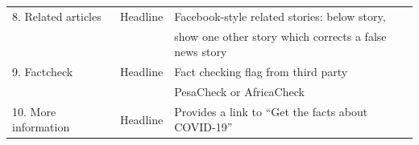 \documentclass[letterpaper, 12pt, parskip=full,]{scrartcl}
\begin{document}
\begin{table}[H]
\begin{adjustbox}{max width = \textwidth}
\begin{tabular}{l|l|l}
\\
8. Related articles                                                                                                       & Headline                                                                                                     & Facebook-style related stories: below story,\\ & & show one other story which corrects a false news story                                                                                                                                                                                                                                                                                             \\
9. Factcheck                                                                                                      & Headline                                                                                                     & Fact checking flag from third party\\ & & PesaCheck or AfricaCheck
 \\
10. More information                                                                                                      & Headline                                                                                                     & Provides a link to ``Get the facts about COVID-19''\\

\end{tabular}
\end{adjustbox}
\end{table}
\end{document}
